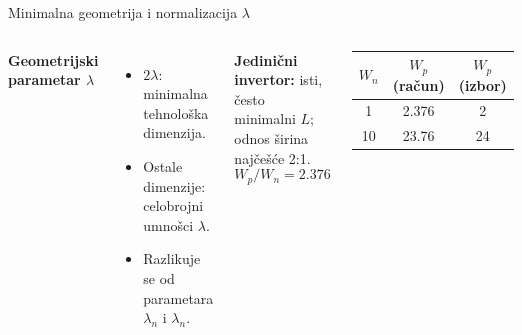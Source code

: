 \begin{frame}[label=09_2-s048]{Minimalna geometrija i normalizacija $\lambda$}
\begin{columns}[T,onlytextwidth]\centering {}\textbf{Geometrijski parametar $\lambda$}
\begin{itemize}
\item $2\lambda$: minimalna tehnološka dimenzija.
\item Ostale dimenzije: celobrojni umnošci $\lambda$.
\item Razlikuje se od parametara $\lambda_n$ i $\lambda_n$.
\end{itemize}
\textbf{Jedinični invertor:} isti, često minimalni $L$; odnos širina najčešće 2:1.
\[W_p/W_n=2.376\]
\begin{center}\begin{tabular}{ccc}\toprule
$W_n$ & $W_p$ (račun) & $W_p$ (izbor)\\\midrule
1 & 2.376 & 2\\
10 & 23.76 & 24\\\bottomrule
\end{tabular}\end{center}\end{columns}
\end{frame}
